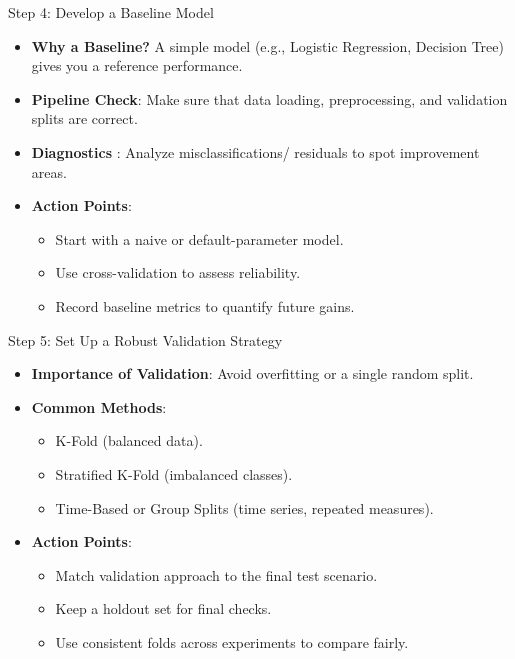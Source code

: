 \documentclass[ignorenonframetext,]{beamer}
\begin{document}
\begin{frame}{Step 4: Develop a Baseline Model}
\begin{itemize}
  \item \textbf{Why a Baseline?} A simple model (e.g., Logistic Regression, Decision Tree) gives you a reference performance.
  \item \textbf{Pipeline Check}: Make sure that data loading, preprocessing, and validation splits are correct.
  \item \textbf{Diagnostics} : Analyze misclassifications/ residuals to spot improvement areas.
  \item \textbf{Action Points}:
    \begin{itemize}
      \item Start with a naive or default-parameter model.
      \item Use cross-validation to assess reliability.
      \item Record baseline metrics to quantify future gains.
    \end{itemize}
\end{itemize}
\end{frame}

\begin{frame}{Step 5: Set Up a Robust Validation Strategy}
\begin{itemize}
  \item \textbf{Importance of Validation}: Avoid overfitting or a single random split.
  \item \textbf{Common Methods}:
    \begin{itemize}
      \item K-Fold (balanced data).
      \item Stratified K-Fold (imbalanced classes).
      \item Time-Based or Group Splits (time series, repeated measures).
    \end{itemize}
  \item \textbf{Action Points}:
    \begin{itemize}
      \item Match validation approach to the final test scenario.
      \item Keep a holdout set for final checks.
      \item Use consistent folds across experiments to compare fairly.
    \end{itemize}
\end{itemize}
\end{frame}
\end{document}
